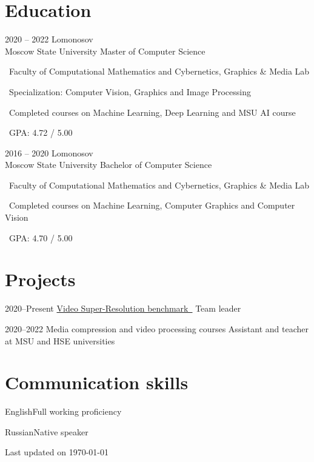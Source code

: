 \documentclass{tccv}
\newcommand{\itempoint}{\faAngleDoubleRight~}
\newcommand{\updateinfo}[1][\today]{\par\vfill\hfill{\scriptsize\color{gray}Last updated on #1}}
\begin{document}
\vspace{200pt}

\section{Education}

\begin{eventlist}

\item{2020 -- 2022}
     {Lomonosov \\ Moscow State University}
     {Master of Computer Science}

     \itempoint Faculty of Computational Mathematics and Cybernetics, Graphics \& Media Lab

     \itempoint Specialization: Computer Vision, Graphics and Image Processing

     \itempoint Completed courses on Machine Learning, Deep Learning and MSU AI course

     \itempoint GPA: 4.72 / 5.00

\item{2016 -- 2020}
     {Lomonosov \\ Moscow State University}
     {Bachelor of Computer Science}

     \itempoint Faculty of Computational Mathematics and Cybernetics, Graphics \& Media Lab

     \itempoint Completed courses on Machine Learning, Computer Graphics and Computer Vision

     \itempoint GPA: 4.70 / 5.00
\end{eventlist}

\section{Projects}

\begin{yearlist}

\item{2020--Present}
     {\href{https://videoprocessing.ai/benchmarks/video-super-resolution.html}{Video Super-Resolution benchmark~\faExternalLink*}}
     {Team leader}

\item{2020--2022}
     {Media compression and video processing courses}
     {Assistant and teacher at MSU and HSE universities} 

\end{yearlist}

\section{Communication skills}

\begin{factlist}
\item{English}{Full working proficiency}
\item{Russian}{Native speaker}
\end{factlist}

\nocite{kirillova2022erqa}
\nocite{lyapustin2022towards}

\printbibliography[title={Publications}]

\updateinfo
\end{document}

